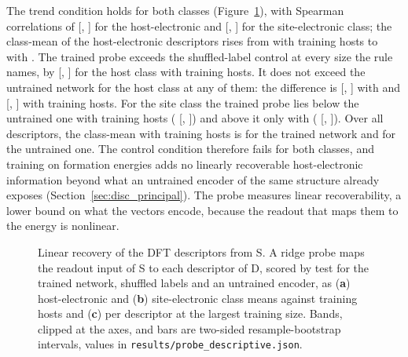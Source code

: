 The trend condition holds for both classes (Figure~\ref{fig:app_probe}), with Spearman correlations of \numNetProbeHostTrendRho{} [\numNetProbeHostTrendRhoLo{}, \numNetProbeHostTrendRhoHi{}] for the host-electronic and \numNetProbeSiteTrendRho{} [\numNetProbeSiteTrendRhoLo{}, \numNetProbeSiteTrendRhoHi{}] for the site-electronic class; the class-mean \Rsq{} of the host-electronic descriptors rises from \numNetProbeHostRsqTwoHundred{} with \numCfgBudgetsHostsItemFour{} training hosts to \numNetProbeHostRsqSixHundredFiftyFour{} with \numCfgBudgetsMax{}. The trained probe exceeds the shuffled-label control at every size the rule names, by \numNetProbeHostMinusShuffledSixHundredFiftyFour{} [\numNetProbeHostMinusShuffledSixHundredFiftyFourLo{}, \numNetProbeHostMinusShuffledSixHundredFiftyFourHi{}] for the host class with \numCfgBudgetsMax{} training hosts. It does not exceed the untrained network for the host class at any of them: the difference is \numNetProbeHostMinusUntrainedTwoHundred{} [\numNetProbeHostMinusUntrainedTwoHundredLo{}, \numNetProbeHostMinusUntrainedTwoHundredHi{}] with \numCfgBudgetsHostsItemFour{} and \numNetProbeHostMinusUntrainedSixHundredFiftyFour{} [\numNetProbeHostMinusUntrainedSixHundredFiftyFourLo{}, \numNetProbeHostMinusUntrainedSixHundredFiftyFourHi{}] with \numCfgBudgetsMax{} training hosts. For the site class the trained probe lies below the untrained one with \numCfgBudgetsHostsItemFour{} training hosts (\numNetProbeSiteMinusUntrainedTwoHundred{} [\numNetProbeSiteMinusUntrainedTwoHundredLo{}, \numNetProbeSiteMinusUntrainedTwoHundredHi{}]) and above it only with \numCfgBudgetsMax{} (\numNetProbeSiteMinusUntrainedSixHundredFiftyFour{} [\numNetProbeSiteMinusUntrainedSixHundredFiftyFourLo{}, \numNetProbeSiteMinusUntrainedSixHundredFiftyFourHi{}]). Over all descriptors, the class-mean \Rsq{} with \numCfgBudgetsMax{} training hosts is \numNetProbeAllRsqSixHundredFiftyFour{} for the trained network and \numProbeDescriptiveSVTwoAllCurvesInitZeroSixHundredFiftyFourMean{} for the untrained one. The control condition therefore fails for both classes, and training on formation energies adds no linearly recoverable host-electronic information beyond what an untrained encoder of the same structure already exposes (Section~\ref{sec:disc_principal}). The probe measures linear recoverability, a lower bound on what the vectors encode, because the readout that maps them to the energy is nonlinear.

\begin{figure}[H]
\centering
{}
\caption{Linear recovery of the DFT descriptors from S. A ridge probe maps the readout input of S to each descriptor of D, scored by test \Rsq{} for the trained network, shuffled labels and an untrained encoder, as (\textbf{a}) host-electronic and (\textbf{b}) site-electronic class means against training hosts and (\textbf{c}) per descriptor at the largest training size. Bands, clipped at the axes, and bars are two-sided resample-bootstrap intervals, values in \texttt{results/probe\_descriptive.json}.\label{fig:app_probe}}
\end{figure}

